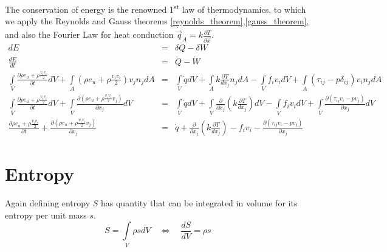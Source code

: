 The conservation of energy is the renowned 1\textsuperscript{st} law of thermodynamics, to which we apply the Reynolds and Gauss theorems \eqref{reynolds_theorem},\eqref{gauss_theorem}, and also the Fourier Law for heat conduction $\dot{\vec{q}}_A = k\frac{\partial T}{\partial \vec{x}}$.
\begin{eqnarray}
    \label{differential_energy}
    dE &=& \delta Q- \delta W \\
    \frac{dE}{dt} &=& \dot{Q} - \dot{W} \\
    \int\limits_V\frac{\partial \rho e_u+ \rho\frac{v_i v_i}{2}}{\partial t} dV +  \int\limits_A (\rho e_u + \rho\frac{v_i v_i}{2}) v_j n_j dA &=&  \int\limits_V \dot{q} dV + \int\limits_A k\frac{\partial T}{d x_j} n_j dA - \int\limits_V f_i v_i dV + \int\limits_A (\tau_{ij}- p \delta_{ij} )v_i n_j dA \\ 
    \int\limits_V\frac{\partial \rho e_u+ \rho\frac{v_i v_i}{2}}{\partial t} dV +  \int\limits_V \frac{\partial (\rho e_u+ \rho\frac{v_i v_i}{2} v_j)}{\partial x_j} dV &=&  \int\limits_V \dot{q} dV + \int\limits_V \frac{\partial} {\partial x_j} \left( k\frac{\partial T}{d x_j} \right) dV - \int\limits_V f_i v_i dV + \int\limits_V \frac{\partial (\tau_{ij}v_i- p v_j )}{\partial x_j} dV \\ 
    \frac{\partial \rho e_u+ \rho\frac{v_i v_i}{2}}{\partial t} +  \frac{\partial (\rho e_u + \rho\frac{v_i v_i}{2} v_j)}{\partial x_j} &=&  \dot{q} + \frac{\partial} {\partial x_j} \left( k\frac{\partial T}{d x_j} \right) - f_i v_i  -  \frac{\partial (\tau_{ij}v_i- p v_j )}{\partial x_j} 
\end{eqnarray}





\section{Entropy}
Again defining entropy $S$ has quantity that can be integrated in volume for its entropy per unit mass $s$. 
\begin{equation}
    S=\int\limits_V\rho s dV \quad  \Leftrightarrow \quad  \frac{dS}{dV}= \rho s 
\end{equation}\

